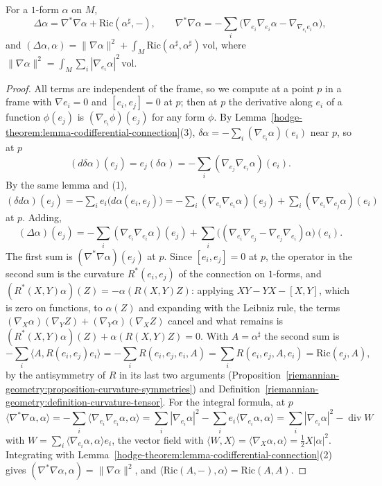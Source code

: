 \begin{proposition}\label{hodge-theorem:proposition-weitzenbock}
For a $1$-form $\alpha$ on $M$,
\[
\Delta\alpha = \nabla^*\nabla\alpha + \mathrm{Ric}(\alpha^\sharp, -), \qquad \nabla^*\nabla\alpha = -\sum_i\bigl(\nabla_{e_i}\nabla_{e_i}\alpha - \nabla_{\nabla_{e_i}e_i}\alpha\bigr),
\]
and $(\Delta\alpha, \alpha) = \|\nabla\alpha\|^2 + \int_M\mathrm{Ric}(\alpha^\sharp, \alpha^\sharp)\,\mathrm{vol}$, where $\|\nabla\alpha\|^2 = \int_M\sum_i|\nabla_{e_i}\alpha|^2\,\mathrm{vol}$.
\end{proposition}

\begin{proof}
All terms are independent of the frame, so we compute at a point $p$ in a frame with $\nabla e_i = 0$ and $[e_i, e_j] = 0$ at $p$; then at $p$ the derivative along $e_i$ of a function $\phi(e_j)$ is
$(\nabla_{e_i}\phi)(e_j)$ for any form $\phi$. By Lemma~\ref{hodge-theorem:lemma-codifferential-connection}(3), $\delta\alpha = -\sum_i(\nabla_{e_i}\alpha)(e_i)$ near $p$, so at $p$
\[
(d\delta\alpha)(e_j) = e_j(\delta\alpha) = -\sum_i(\nabla_{e_j}\nabla_{e_i}\alpha)(e_i).
\]
By the same lemma and (1), $(\delta d\alpha)(e_j) = -\sum_ie_i\bigl(d\alpha(e_i, e_j)\bigr) = -\sum_i(\nabla_{e_i}\nabla_{e_i}\alpha)(e_j) + \sum_i(\nabla_{e_i}\nabla_{e_j}\alpha)(e_i)$ at $p$. Adding,
\[
(\Delta\alpha)(e_j) = -\sum_i(\nabla_{e_i}\nabla_{e_i}\alpha)(e_j) + \sum_i\bigl((\nabla_{e_i}\nabla_{e_j} - \nabla_{e_j}\nabla_{e_i})\alpha\bigr)(e_i) .
\]
The first sum is $(\nabla^*\nabla\alpha)(e_j)$ at $p$. Since $[e_i, e_j] = 0$ at $p$, the operator in the second sum is the curvature $R^*(e_i, e_j)$ of the connection on $1$-forms, and
$(R^*(X, Y)\alpha)(Z) = -\alpha(R(X, Y)Z)$: applying $XY - YX - [X, Y]$, which is zero on functions, to $\alpha(Z)$ and expanding with the Leibniz rule, the terms $(\nabla_X\alpha)(\nabla_YZ) + (\nabla_Y\alpha)(\nabla_XZ)$
cancel and what remains is $(R^*(X, Y)\alpha)(Z) + \alpha(R(X, Y)Z) = 0$. With $A = \alpha^\sharp$ the second sum is
\[
-\sum_i\langle A, R(e_i, e_j)e_i\rangle = -\sum_iR(e_i, e_j, e_i, A) = \sum_iR(e_i, e_j, A, e_i) = \mathrm{Ric}(e_j, A),
\]
by the antisymmetry of $R$ in its last two arguments (Proposition~\ref{riemannian-geometry:proposition-curvature-symmetries}) and Definition~\ref{riemannian-geometry:definition-curvature-tensor}. For the integral formula, at $p$
\[
\langle\nabla^*\nabla\alpha, \alpha\rangle = -\sum_i\langle\nabla_{e_i}\nabla_{e_i}\alpha, \alpha\rangle = \sum_i|\nabla_{e_i}\alpha|^2 - \sum_ie_i\langle\nabla_{e_i}\alpha, \alpha\rangle = \sum_i|\nabla_{e_i}\alpha|^2 - \operatorname{div}W
\]
with $W = \sum_i\langle\nabla_{e_i}\alpha, \alpha\rangle e_i$, the vector field with $\langle W, X\rangle = \langle\nabla_X\alpha, \alpha\rangle = \frac12X|\alpha|^2$. Integrating with
Lemma~\ref{hodge-theorem:lemma-codifferential-connection}(2) gives $(\nabla^*\nabla\alpha, \alpha) = \|\nabla\alpha\|^2$, and $\langle\mathrm{Ric}(A, -), \alpha\rangle = \mathrm{Ric}(A, A)$.
\end{proof}

